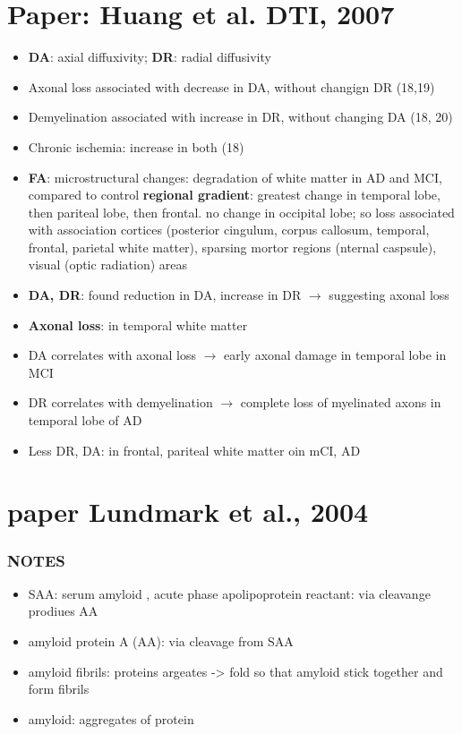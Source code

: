 \documentclass[fleqn]{article}\usepackage{caption}
\begin{document}
\section{Paper: Huang et al. DTI, 2007}
\begin{itemize}
\item \textbf{DA}: axial diffuxivity; \textbf{DR}: radial diffusivity
\item Axonal loss associated with decrease in DA, without changign DR (18,19)
\item Demyelination associated with increase in DR, without changing DA (18, 20)
\item Chronic ischemia: increase in both (18)
\item \textbf{FA}: microstructural changes: degradation of white matter in AD and MCI, compared to control \textbf{regional gradient}: greatest change in temporal lobe, then pariteal lobe, then frontal. no change in occipital lobe; so loss associated with association cortices (posterior cingulum, corpus callosum, temporal, frontal, parietal white matter), sparsing mortor regions (nternal caspsule), visual (optic radiation) areas
\item \textbf{DA, DR}: found reduction in DA, increase in DR $\rightarrow$ suggesting axonal loss
\item \textbf{Axonal loss}: in temporal white matter 
\item DA correlates with axonal loss $\rightarrow$  early axonal damage in temporal lobe in MCI
\item DR correlates with demyelination $\rightarrow$ complete loss of myelinated axons in temporal lobe of AD
\item Less DR, DA: in frontal, pariteal white matter oin mCI, AD
\end{itemize}

\section{paper Lundmark et al., 2004}
\subsubsection{NOTES}
\begin{itemize}
\item SAA: serum amyloid , acute phase apolipoprotein reactant: via cleavange prodiues AA
\item amyloid protein A (AA): via cleavage from SAA
\item amyloid fibrils: proteins argeates -> fold so that amyloid  stick together and form fibrils
\item amyloid: aggregates of protein
\end{itemize}
\end{document}
